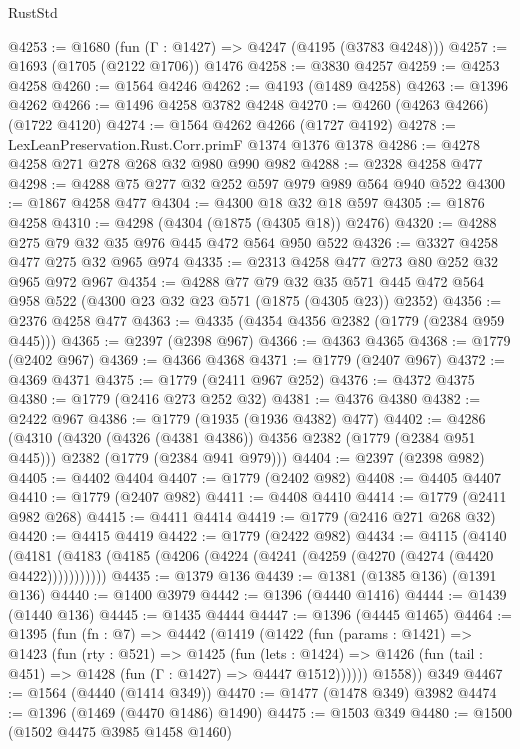 \begin{lexlean}{RustStd}
\begin{coremodule}
@4253 := @1680 (fun (Γ : @1427) => @4247 (@4195 (@3783 @4248)))
@4257 := @1693 (@1705 (@2122 @1706)) @1476
@4258 := @3830 @4257
@4259 := @4253 @4258
@4260 := @1564 @4246
@4262 := @4193 (@1489 @4258)
@4263 := @1396 @4262
@4266 := @1496 @4258 @3782 @4248
@4270 := @4260 (@4263 @4266) (@1722 @4120)
@4274 := @1564 @4262 @4266 (@1727 @4192)
@4278 := LexLeanPreservation.Rust.Corr.primF @1374 @1376 @1378
@4286 := @4278 @4258 @271 @278 @268 @32 @980 @990 @982
@4288 := @2328 @4258 @477
@4298 := @4288 @75 @277 @32 @252 @597 @979 @989 @564 @940 @522
@4300 := @1867 @4258 @477
@4304 := @4300 @18 @32 @18 @597
@4305 := @1876 @4258
@4310 := @4298 (@4304 (@1875 (@4305 @18)) @2476)
@4320 := @4288 @275 @79 @32 @35 @976 @445 @472 @564 @950 @522
@4326 := @3327 @4258 @477 @275 @32 @965 @974
@4335 := @2313 @4258 @477 @273 @80 @252 @32 @965 @972 @967
@4354 := @4288
    @77
    @79
    @32
    @35
    @571
    @445
    @472
    @564
    @958
    @522
    (@4300 @23 @32 @23 @571 (@1875 (@4305 @23)) @2352)
@4356 := @2376 @4258 @477
@4363 := @4335 (@4354 @4356 @2382 (@1779 (@2384 @959 @445)))
@4365 := @2397 (@2398 @967)
@4366 := @4363 @4365
@4368 := @1779 (@2402 @967)
@4369 := @4366 @4368
@4371 := @1779 (@2407 @967)
@4372 := @4369 @4371
@4375 := @1779 (@2411 @967 @252)
@4376 := @4372 @4375
@4380 := @1779 (@2416 @273 @252 @32)
@4381 := @4376 @4380
@4382 := @2422 @967
@4386 := @1779 (@1935 (@1936 @4382) @477)
@4402 := @4286
    (@4310
      (@4320 (@4326 (@4381 @4386)) @4356 @2382 (@1779 (@2384 @951 @445)))
      @2382
      (@1779 (@2384 @941 @979)))
@4404 := @2397 (@2398 @982)
@4405 := @4402 @4404
@4407 := @1779 (@2402 @982)
@4408 := @4405 @4407
@4410 := @1779 (@2407 @982)
@4411 := @4408 @4410
@4414 := @1779 (@2411 @982 @268)
@4415 := @4411 @4414
@4419 := @1779 (@2416 @271 @268 @32)
@4420 := @4415 @4419
@4422 := @1779 (@2422 @982)
@4434 := @4115
    (@4140 (@4181 (@4183 (@4185 (@4206 (@4224 (@4241 (@4259 (@4270 (@4274 (@4420 @4422)))))))))))
@4435 := @1379 @136
@4439 := @1381 (@1385 @136) (@1391 @136)
@4440 := @1400 @3979
@4442 := @1396 (@4440 @1416)
@4444 := @1439 (@1440 @136)
@4445 := @1435 @4444
@4447 := @1396 (@4445 @1465)
@4464 := @1395
    (fun (fn : @7) =>
    @4442
      (@1419
        (@1422
          (fun (params : @1421) =>
          @1423
            (fun (rty : @521) =>
            @1425
              (fun (lets : @1424) =>
              @1426 (fun (tail : @451) => @1428 (fun (Γ : @1427) => @4447 @1512))))))
        @1558))
    @349
@4467 := @1564 (@4440 (@1414 @349))
@4470 := @1477 (@1478 @349) @3982
@4474 := @1396 (@1469 (@4470 @1486) @1490)
@4475 := @1503 @349
@4480 := @1500 (@1502 @4475 @3985 @1458 @1460)

\end{coremodule}
\end{lexlean}

